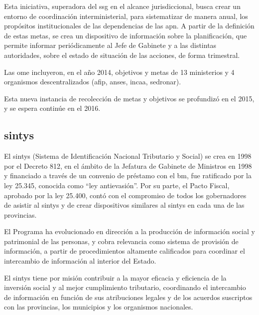 Esta iniciativa, superadora del \ac{ssg} en el alcance jurisdiccional, busca crear un entorno de coordinación interministerial, para sistematizar de manera anual, los propósitos institucionales de las dependencias de las \ac{apn}. A partir de la definición de estas metas, se crea un dispositivo de información sobre la planificación, que permite informar periódicamente al Jefe de Gabinete y a las distintas autoridades, sobre el estado de situación de las acciones, de forma trimestral.

Las \ac{ome} incluyeron, en el año 2014, objetivos y metas de 13 ministerios y 4 organismos descentralizados (\acrshort{afip}, \acrshort{anses}, \acrshort{incaa}, \acrshort{sedronar}).

Esta nueva instancia de recolección de metas y objetivos se profundizó en el 2015, y se espera continúe en el 2016.%

\subsection{\acrfull{sintys}}

El \ac{sintys} (Sistema de Identificación Nacional Tributario y Social) se crea en 1998 por el Decreto 812, en el ámbito de la Jefatura de Gabinete de Ministros en 1998 y financiado a través de un convenio de préstamo con el \ac{bm}, fue ratificado por la ley 25.345, conocida como ``ley antievasión''. Por su parte, el Pacto Fiscal, aprobado por la ley 25.400, contó con el compromiso de todos los gobernadores de asistir al \ac{sintys} y de crear dispositivos similares al \ac{sintys} en cada una de las provincias. 

El Programa ha evolucionado en dirección a la producción de información social y patrimonial de las personas, y cobra relevancia como sistema de provisión de información, a partir de procedimientos altamente calificados para coordinar  el intercambio de información al interior del Estado. %

El \ac{sintys} tiene por misión contribuir a la mayor eficacia y eficiencia de la inversión social y al mejor cumplimiento tributario, coordinando el intercambio de información en función de sus atribuciones legales y de los acuerdos suscriptos con las provincias, los municipios y los organismos nacionales.

